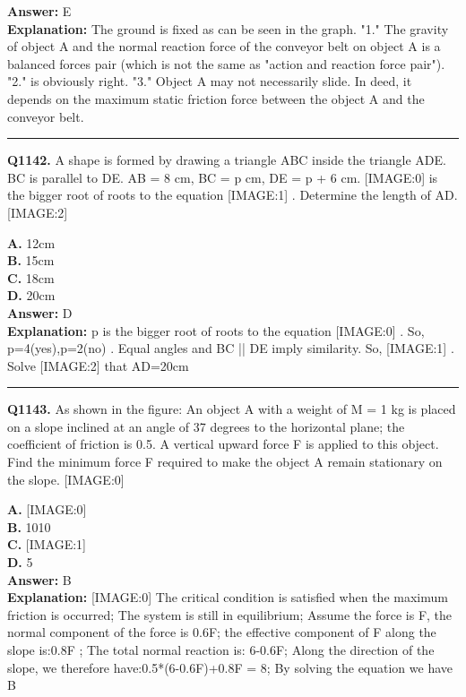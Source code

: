 \documentclass[12pt]{article}
\begin{document}
\textbf{Answer:} E \\
\textbf{Explanation:} The ground is fixed as can be seen in the graph. "1." The gravity of object A and the normal reaction force of the conveyor belt on object A is a balanced forces pair (which is not the same as "action and reaction force pair"). "2." is obviously right. "3." Object A may not necessarily slide. In deed, it depends on the maximum static friction force between the object A and the conveyor belt.

\hrule
\vspace{1em}


\noindent
\textbf{Q1142.} A shape is formed by drawing a triangle ABC inside the triangle ADE. BC is parallel to DE. AB = 8 cm, BC = p cm, DE = p + 6 cm.
[IMAGE:0]
is the bigger root of roots to the equation
[IMAGE:1]
.
Determine the length of AD.
[IMAGE:2]



\textbf{A.} 12cm \\
\textbf{B.} 15cm \\
\textbf{C.} 18cm \\
\textbf{D.} 20cm \\

\textbf{Answer:} D \\
\textbf{Explanation:} p
is the bigger root of roots to the equation
[IMAGE:0]
. So, p=4(yes),p=2(no)
.
Equal angles and BC || DE imply similarity.
So,
[IMAGE:1]
.
Solve
[IMAGE:2]
that AD=20cm

\hrule
\vspace{1em}


\noindent
\textbf{Q1143.} As shown in the figure: An object A with a weight of M = 1 kg is placed on a slope inclined at an angle of 37 degrees to the horizontal plane; the coefficient of friction is 0.5. A vertical upward force F is applied to this object. Find the minimum force F required to make the object A remain stationary on the slope.
[IMAGE:0]



\textbf{A.} [IMAGE:0] \\
\textbf{B.} 1010 \\
\textbf{C.} [IMAGE:1] \\
\textbf{D.} 5 \\

\textbf{Answer:} B \\
\textbf{Explanation:} [IMAGE:0]
The critical condition is satisfied when the maximum friction is occurred; The system is still in equilibrium; Assume the force is F, the normal component of the force is 0.6F; the effective component of F along the slope is:0.8F ; The total normal reaction is: 6-0.6F; Along the direction of the slope, we therefore have:0.5*(6-0.6F)+0.8F = 8; By solving the equation we have B
\end{document}
